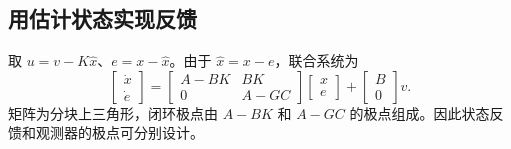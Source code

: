 \subsection{用估计状态实现反馈}

取 $u=v-K\hat x$、$e=x-\hat x$。由于 $\hat x=x-e$，联合系统为
\[
    \begin{bmatrix}\dot x\\\dot e\end{bmatrix}
       =\begin{bmatrix}A-BK&BK\\0&A-GC\end{bmatrix}
        \begin{bmatrix}x\\e\end{bmatrix}
        +\begin{bmatrix}B\\0\end{bmatrix}v .
\]
矩阵为分块上三角形，闭环极点由 $A-BK$ 和 $A-GC$ 的极点组成。因此状态反馈和观测器的极点可分别设计。
